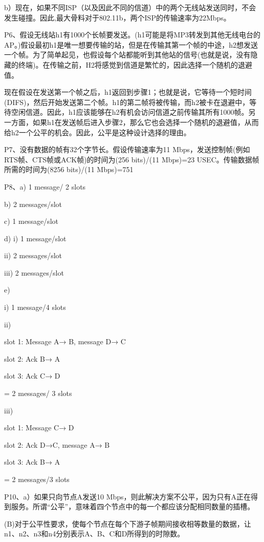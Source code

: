 \documentclass[11pt,UTF8,twoside]{article}
\begin{document}
{		b）现在，如果不同ISP（以及因此不同的信道）中的两个无线站发送同时，不会发生碰撞。因此,最大骨料对于802.11b，两个ISP的传输速率为22Mbps。
		
		P6、假设无线站h1有1000个长帧要发送。(h1可能是将MP3转发到其他无线电台的AP。)假设最初h1是唯一想要传输的站，但是在传输其第一个帧的中途，h2想发送一个帧。为了简单起见，也假设每个站都能听到其他站的信号(也就是说，没有隐藏的终端)。在传输之前，H2将感觉到信道是繁忙的，因此选择一个随机的退避值。
		
		现在假设在发送第一个帧之后，h1返回到步骤1；也就是说，它等待一个短时间(DIFS)，然后开始发送第二个帧。h1的第二帧将被传输，而h2被卡在退避中，等待空闲信道。因此，h1应该能够在h2有机会访问信道之前传输其所有1000帧。另一方面，如果h1在发送帧后进入步骤2，那么它也会选择一个随机的退避值，从而给h2一个公平的机会。因此，公平是这种设计选择的理由。
		
		P7、没有数据的帧有32个字节长。假设传输速率为11 Mbps，发送控制帧(例如RTS帧、CTS帧或ACK帧)的时间为(256 bits)/(11 Mbps)=23 USEC。传输数据帧所需的时间为(8256 bits)/(11 Mbps)=751
		
		P8、a) 1 message/ 2 slots 
		
		b) 2 messages/slot 
		
		c) 1 message/slot 
		
		d)
		i) 1 message/slot 
		
		ii) 2 messages/slot 
		
		iii) 2 messages/slot 
		
		e) 
		
		i) 1 message/4 slots 
		
		ii)
		
		slot 1: Message A→ B, message D→ C 
		
		slot 2: Ack B→ A 
		
		slot 3: Ack C→ D 
		
		= 2 messages/ 3 slots 
		
		iii) 
		
		slot 1: Message C→ D 
		
		slot 2: Ack D→C, message A→ B 
		
		slot 3: Ack B→ A 
		
		= 2 messages/3 slots
		
		P10、a）如果只向节点A发送10 Mbps，则此解决方案不公平，因为只有A正在得到服务。所谓“公平”，意味着四个节点中的每一个都应该分配相同数量的插槽。
		
		(B)对于公平性要求，使每个节点在每个下游子帧期间接收相等数量的数据，让n1、n2、n3和n4分别表示A、B、C和D所得到的时隙数。
		
}
\end{document}
